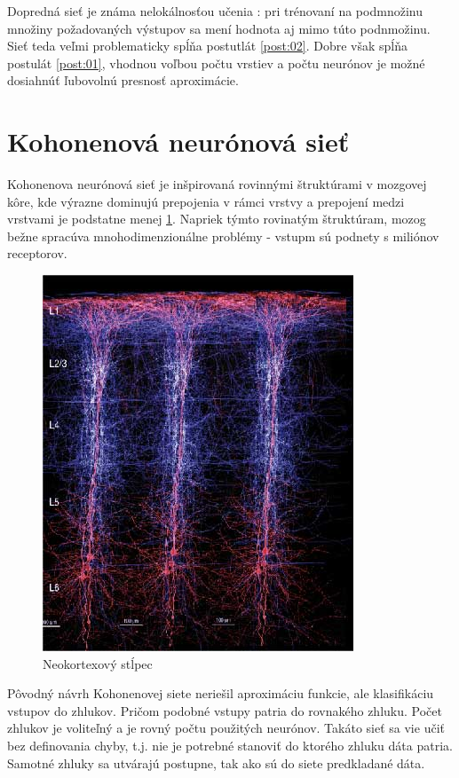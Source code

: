 Dopredná sieť je známa nelokálnosťou učenia : pri trénovaní na podmnožinu množiny
požadovaných výstupov sa mení hodnota aj mimo túto podnmožinu. Sieť teda veľmi
problematicky spĺňa postutlát \ref{post:02}. Dobre však spĺňa postulát \ref{post:01},
vhodnou voľbou počtu vrstiev a počtu neurónov je možné dosiahnúť ľubovolnú
presnosť aproximácie.

\section{Kohonenová neurónová sieť}

Kohonenova neurónová sieť je inšpirovaná rovinnými štruktúrami v mozgovej kôre,
kde výrazne dominujú prepojenia v rámci vrstvy a prepojení medzi vrstvami je
podstatne menej \ref{img:cortical_column}. Napriek týmto rovinatým štruktúram,
mozog bežne spracúva mnohodimenzionálne problémy - vstupm sú podnety s miliónov
receptorov.

\begin{figure}[]
\center
\includegraphics[scale=.4]{../pictures/cortical_column.jpg}
\caption{Neokortexový stĺpec}
\label{img:cortical_column}
\end{figure}

Pôvodný návrh Kohonenovej siete neriešil aproximáciu funkcie, ale klasifikáciu
vstupov do zhlukov. Pričom podobné vstupy patria do rovnakého zhluku. Počet zhlukov
je voliteľný a je rovný počtu použitých neurónov. Takáto sieť sa vie učiť bez
definovania chyby, t.j. nie je potrebné stanoviť do ktorého zhluku dáta patria. Samotné
zhluky sa utvárajú postupne, tak ako sú do siete predkladané dáta.


